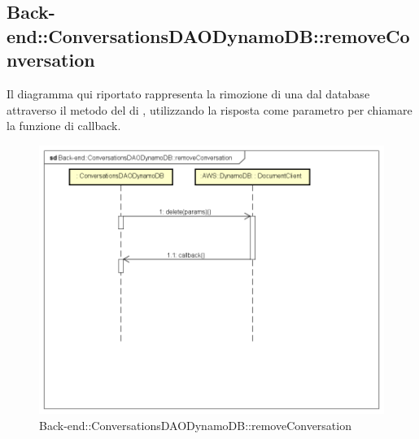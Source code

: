 \subsection{Back-end::ConversationsDAODynamoDB::removeConversation} 
Il diagramma qui riportato rappresenta la rimozione di una  dal database attraverso il metodo  del  di , utilizzando la risposta come parametro per chiamare la funzione di callback.
\begin{figure}[h] \centering \includegraphics[width=\textwidth,height=\textheight,keepaspectratio]{images/diagrams/back-end/Ufficial_Backend/Back-endConversationsDAODynamoDBremoveConversation.png} 	\caption{Back-end::ConversationsDAODynamoDB::removeConversation}
\end{figure}

\newpage

